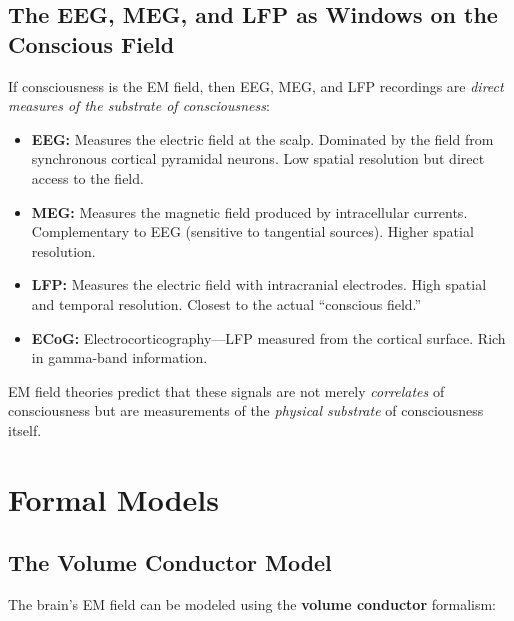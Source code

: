 \documentclass[11pt,a4paper]{report}
\begin{document}
\section{The EEG, MEG, and LFP as Windows on the Conscious Field}

If consciousness is the EM field, then EEG, MEG, and LFP recordings are \emph{direct measures of the substrate of consciousness}:

\begin{fieldbox}
\begin{itemize}[leftmargin=1.5em]
  \item \textbf{EEG:} Measures the electric field at the scalp. Dominated by the field from synchronous cortical pyramidal neurons. Low spatial resolution but direct access to the field.
  \item \textbf{MEG:} Measures the magnetic field produced by intracellular currents. Complementary to EEG (sensitive to tangential sources). Higher spatial resolution.
  \item \textbf{LFP:} Measures the electric field with intracranial electrodes. High spatial and temporal resolution. Closest to the actual ``conscious field.''
  \item \textbf{ECoG:} Electrocorticography---LFP measured from the cortical surface. Rich in gamma-band information.
\end{itemize}
EM field theories predict that these signals are not merely \emph{correlates} of consciousness but are measurements of the \emph{physical substrate} of consciousness itself.
\end{fieldbox}


\chapter{Formal Models}

\section{The Volume Conductor Model}

The brain's EM field can be modeled using the \textbf{volume conductor} formalism:
\end{document}
